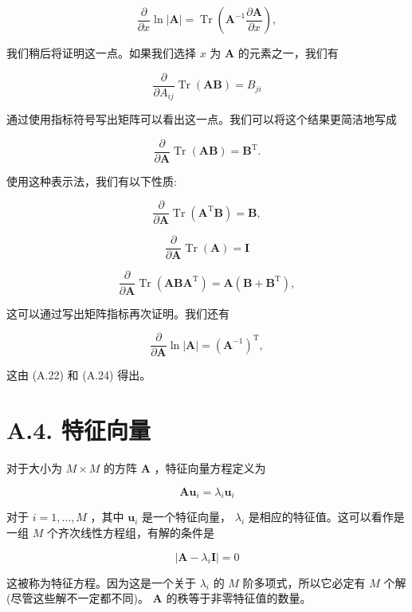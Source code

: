 \documentclass[10pt]{report}
\begin{document}
\[
\frac{\partial }{\partial x}\ln \left| \mathbf{A}\right|  = \operatorname{Tr}\left( {{\mathbf{A}}^{-1}\frac{\partial \mathbf{A}}{\partial x}}\right) , \tag{A.22}
\]

我们稍后将证明这一点。如果我们选择 \(x\) 为 \(\mathbf{A}\) 的元素之一，我们有

\[
\frac{\partial }{\partial {A}_{ij}}\operatorname{Tr}\left( \mathbf{{AB}}\right)  = {B}_{ji} \tag{A.23}
\]

通过使用指标符号写出矩阵可以看出这一点。我们可以将这个结果更简洁地写成

\[
\frac{\partial }{\partial \mathbf{A}}\operatorname{Tr}\left( \mathbf{{AB}}\right)  = {\mathbf{B}}^{\mathrm{T}}. \tag{A.24}
\]

使用这种表示法，我们有以下性质:

\[
\frac{\partial }{\partial \mathbf{A}}\operatorname{Tr}\left( {{\mathbf{A}}^{\mathrm{T}}\mathbf{B}}\right)  = \mathbf{B}, \tag{A.25}
\]

\[
\frac{\partial }{\partial \mathbf{A}}\operatorname{Tr}\left( \mathbf{A}\right)  = \mathbf{I} \tag{A.26}
\]

\[
\frac{\partial }{\partial \mathbf{A}}\operatorname{Tr}\left( {\mathbf{{AB}}{\mathbf{A}}^{\mathrm{T}}}\right)  = \mathbf{A}\left( {\mathbf{B} + {\mathbf{B}}^{\mathrm{T}}}\right) , \tag{A.27}
\]

这可以通过写出矩阵指标再次证明。我们还有

\[
\frac{\partial }{\partial \mathbf{A}}\ln \left| \mathbf{A}\right|  = {\left( {\mathbf{A}}^{-1}\right) }^{\mathrm{T}}, \tag{A.28}
\]

这由 (A.22) 和 (A.24) 得出。

\section*{A.4. 特征向量}

对于大小为 \(M \times  M\) 的方阵 \(\mathbf{A}\) ，特征向量方程定义为

\[
\mathbf{A}{\mathbf{u}}_{i} = {\lambda }_{i}{\mathbf{u}}_{i} \tag{A.29}
\]

对于 \(i = 1,\ldots ,M\) ，其中 \({\mathbf{u}}_{i}\) 是一个特征向量， \({\lambda }_{i}\) 是相应的特征值。这可以看作是一组 \(M\) 个齐次线性方程组，有解的条件是

\[
\left| {\mathbf{A} - {\lambda }_{i}\mathbf{I}}\right|  = 0 \tag{A.30}
\]

这被称为特征方程。因为这是一个关于 \({\lambda }_{i}\) 的 \(M\) 阶多项式，所以它必定有 \(M\) 个解(尽管这些解不一定都不同)。 \(\mathbf{A}\) 的秩等于非零特征值的数量。
\end{document}
